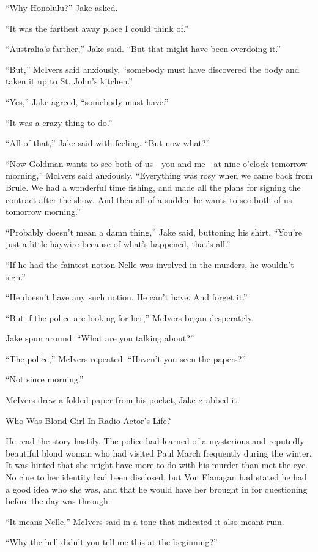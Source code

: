 \documentclass{novel}
\begin{document}
“Why Honolulu?” Jake asked.

“It was the farthest away place I could think of.”

“Australia’s farther,” Jake said. “But that might have been overdoing it.”

“But,” McIvers said anxiously, “somebody must have discovered the body and taken it up to St. John’s kitchen.”

“Yes,” Jake agreed, “somebody must have.”

“It was a crazy thing to do.”

“All of that,” Jake said with feeling. “But now what?”

“Now Goldman wants to see both of us—you and me—at nine o’clock tomorrow morning,” McIvers said anxiously. “Everything was rosy when we came back from Brule. We had a wonderful time fishing, and made all the plans for signing the contract after the show. And then all of a sudden he wants to see both of us tomorrow morning.”

“Probably doesn’t mean a damn thing,” Jake said, buttoning his shirt. “You’re just a little haywire because of what’s happened, that’s all.”

“If he had the faintest notion Nelle was involved in the murders, he wouldn’t sign.”

“He doesn’t have any such notion. He can’t have. And forget it.”

“But if the police are looking for her,” McIvers began desperately.

Jake spun around. “What are you talking about?”

“The police,” McIvers repeated. “Haven’t you seen the papers?”

“Not since morning.”

McIvers drew a folded paper from his pocket, Jake grabbed it.

Who Was Blond Girl In Radio Actor’s Life?

He read the story hastily. The police had learned of a mysterious and reputedly beautiful blond woman who had visited Paul March frequently during the winter. It was hinted that she might have more to do with his murder than met the eye. No clue to her identity had been disclosed, but Von Flanagan had stated he had a good idea who she was, and that he would have her brought in for questioning before the day was through.

“It means Nelle,” McIvers said in a tone that indicated it also meant ruin.

“Why the hell didn’t you tell me this at the beginning?”
\end{document}
